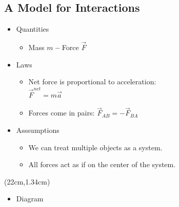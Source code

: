 \documentclass[]{article}
\begin{document}
\begin{PresentSpace}
\vspace{-10pt}
\section*{A Model for Interactions}
\vspace{-10pt}
\begin{itemize}
	\item Quantities
	\begin{itemize}
		\item Mass \quad $m$ \qquad \textbf{--} Force \quad $\vec{F}$
	\end{itemize}
	\item Laws
	\begin{itemize}
		\item Net force is proportional to acceleration: \\
		$\vec{F}^{net}=m\vec{a}$
		\item Forces come in pairs: $\vec{F}_{AB} = -\vec{F}_{BA}$
	\end{itemize}
	\item Asssumptions
	\begin{itemize}
		\item We can treat multiple objects as a system.
		\item All forces act as if on the center of the system.
	\end{itemize}
\end{itemize}
\end{PresentSpace}
\begin{textblock*}{5cm}(22cm,1.34cm)
\Large
\begin{itemize}
	\item Diagram
\end{itemize}
\centering
{}
\end{textblock*}
\newpage
\begin{TeacherMargin}

\end{TeacherMargin}
\end{document}
